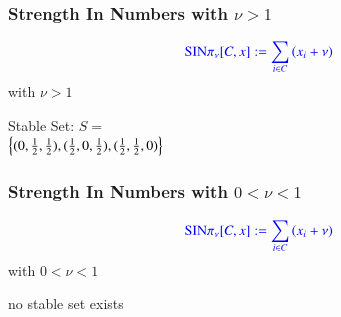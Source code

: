 \documentclass{beamer}
\def\mcolor#1#2{\rule{0ex}{0ex}\color{#1}#2\color{black}{}}
\begin{document}
\begin{frame}
  \frametitle{Strength In Numbers with $\nu > 1$}
\begin{minipage}{0.5\textwidth}
\[\mcolor{blue}{\text{SIN}\pi_\nu[C,x]:=\sum _{i\in C} \left(x_i+\nu \right)}\]
\hspace*{5ex} with \(\nu>1\)
\end{minipage}\pause
\begin{minipage}{0.45\textwidth}
  \begin{center}
   
  \end{center}
\end{minipage}\pause

\vspace*{-1cm}
\begin{minipage}[b]{0.45\textwidth}
Stable Set: $S=$\\
$\left\{(0,{1\over 2},{1\over 2}), ({1\over 2},0,{1\over 2}), 
         ({1\over 2},{1\over 2},0)\right\}$
\end{minipage}

\end{frame}

\begin{frame}
\frametitle{Strength In Numbers with $0<\nu<1$}

\begin{minipage}{0.45\textwidth}
\[\mcolor{blue}{\text{SIN}\pi_\nu[C,x]:=\sum _{i\in C} \left(x_i+\nu \right)} \]
\hspace*{5ex} with \(0<\nu<1\)\bigskip

no stable set exists

\end{minipage}
\begin{minipage}{0.45\textwidth}

  \centering
  
\end{minipage}
\end{frame}
\end{document}
